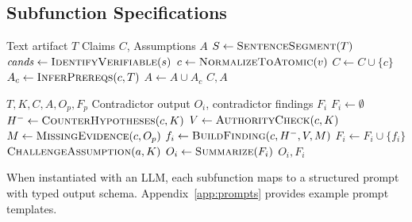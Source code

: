 \documentclass[11pt,a4paper]{article}
\begin{document}
\subsection{Subfunction Specifications}

\begin{algorithm}[h]
\caption{\textsc{ExtractClaims}: Atomic Claim and Assumption Extraction}
\label{alg:extract}
\begin{algorithmic}[1]
\Require Text artifact $T$
\Ensure Claims $C$, Assumptions $A$
\State $S \gets \textsc{SentenceSegment}(T)$ 
  \State $\mathit{cands} \gets \textsc{IdentifyVerifiable}(s)$ 
    \State $c \gets \textsc{NormalizeToAtomic}(v)$ 
    \State $C \gets C \cup \{c\}$
    \State $A_c \gets \textsc{InferPrereqs}(c, T)$ 
    \State $A \gets A \cup A_c$
  \EndFor
\EndFor
\State \Return $C, A$
\end{algorithmic}
\end{algorithm}

\begin{algorithm}[h]
\caption{\textsc{IpchaContradict}: Structured Falsification Pass}
\label{alg:contra}
\begin{algorithmic}[1]
\Require $T, K, C, A, O_p, F_p$
\Ensure Contradictor output $O_i$, contradictor findings $F_i$
\State $F_i \gets \emptyset$
  \State $H^{-} \gets \textsc{CounterHypotheses}(c, K)$ 
  \State $V \gets \textsc{AuthorityCheck}(c, K)$ 
  \State $M \gets \textsc{MissingEvidence}(c, O_p)$ 
    \State $f_i \gets \textsc{BuildFinding}(c, H^{-}, V, M)$
    \State $F_i \gets F_i \cup \{f_i\}$
  \EndIf
\EndFor
{}
  \State $\textsc{ChallengeAssumption}(a, K)$ 
\EndFor
\State $O_i \gets \textsc{Summarize}(F_i)$
\State \Return $O_i, F_i$
\end{algorithmic}
\end{algorithm}

\noindent When instantiated with an LLM, each subfunction maps to a structured prompt with typed output schema.
Appendix~\ref{app:prompts} provides example prompt templates.
\end{document}
